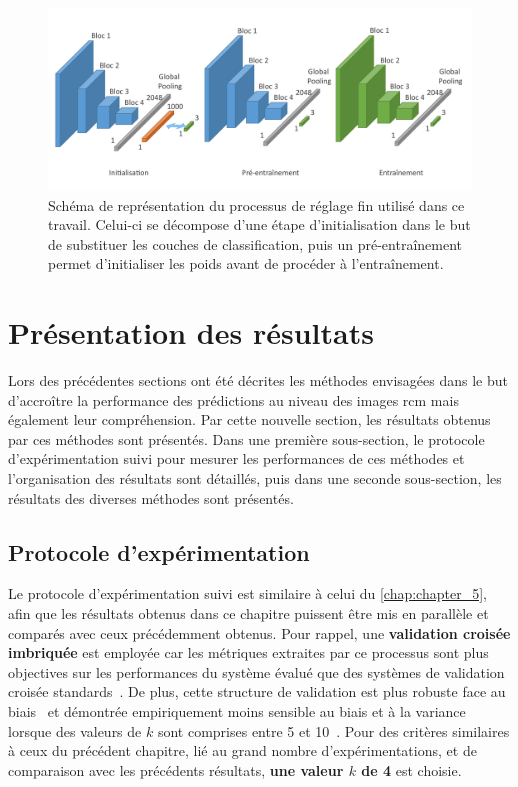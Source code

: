 \begin{figure}[H]
    \centering
    \includegraphics[width=\linewidth]{contents/chapter_6/resources/scheme_image_improvement_image_fine_tune.pdf}
    \caption{Schéma de représentation du processus de réglage fin utilisé dans ce travail. Celui-ci se décompose d'une étape d'initialisation dans le but de substituer les couches de classification, puis un pré-entraînement permet d'initialiser les poids avant de procéder à l'entraînement.}
    \label{fig:scheme_image_fine_tune}
\end{figure}\par
\clearpage

\section{Présentation des résultats}
Lors des précédentes sections ont été décrites les méthodes envisagées dans le but d'accroître la performance des prédictions au niveau des images \gls{rcm} mais également leur compréhension. Par cette nouvelle section, les résultats obtenus par ces méthodes sont présentés. Dans une première sous-section, le protocole d'expérimentation suivi pour mesurer les performances de ces méthodes et l'organisation des résultats sont détaillés, puis dans une seconde sous-section, les résultats des diverses méthodes sont présentés.\par

\subsection{Protocole d'expérimentation}
Le protocole d'expérimentation suivi est similaire à celui du \cref{chap:chapter_5}, afin que les résultats obtenus dans ce chapitre puissent être mis en parallèle et comparés avec ceux précédemment obtenus. Pour rappel, une \textbf{validation croisée imbriquée} est employée car les métriques extraites par ce processus sont plus objectives sur les performances du système évalué que des systèmes de validation croisée standards~\cite{Cawley2010}. De plus, cette structure de validation est plus robuste face au biais~\cite{Cawley2010} et démontrée empiriquement moins sensible au biais et à la variance lorsque des valeurs de $k$ sont comprises entre 5 et 10~\cite{James2000}. Pour des critères similaires à ceux du précédent chapitre, lié au grand nombre d'expérimentations, et de comparaison avec les précédents résultats, \textbf{une valeur $k$ de 4} est choisie.\par

